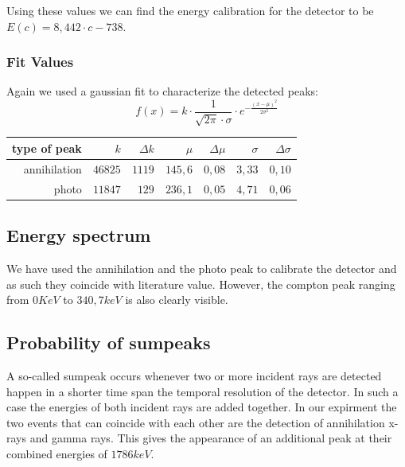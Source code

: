 \documentclass[bigchapter,colorback,accentcolor=tud4b,linedtoc,11pt]{tudreport}
\begin{document}
Using these values we can find the energy calibration for the detector to be $E(c) = 8,442 \cdot c - 738$.

\subsubsection{Fit Values}
Again we used a gaussian fit to characterize the detected peaks:
$$f(x) = k\cdot \frac{1}{\sqrt{2 \pi } \cdot \sigma} \cdot e^{-\frac{(x-\mu )^2}{2 \sigma ^2}}$$

\begin{center}
  \begin{tabular}{r|r|r|r|r|r|r}
     type of peak & $k$     & $\Delta k$ & $\mu$   & $\Delta \mu$ & $\sigma$ & $\Delta \sigma$ \\ \hline
     annihilation & $46825$ & $1119$     & $145,6$ & $0,08$       & $3,33$   & $0,10$          \\ \hline
     photo        & $11847$ & $129$      & $236,1$ & $0,05$       & $4,71$   & $0,06$          \\
	\end{tabular}
\end{center}


\subsection{Energy spectrum}
We have used the annihilation and the photo peak to calibrate the detector and
as such they coincide with literature value. However, the compton peak ranging
from $0 KeV$ to $340,7 keV$ is also clearly visible.
\subsection{Probability of sumpeaks}
A so-called sumpeak occurs whenever two or more incident rays are detected happen in a
shorter time span the temporal resolution of the detector. In such a case the
energies of both incident rays are added together. In our expirment the two
events that can coincide with each other are the detection of annihilation
x-rays and gamma rays. This gives the appearance of an additional peak at their
combined energies of $1786 keV$.
\end{document}

